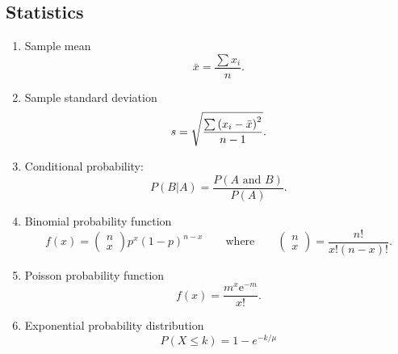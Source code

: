 \subsection{Statistics}

\begin{enumerate}
	\item Sample mean
	\begin{equation*}
	\bar{x}=\frac{\sum x_{i}}{n}.
	\end{equation*}
	
	\item Sample standard deviation
	\begin{equation*}
	s=\sqrt{\frac{\sum \left( x_{i}-\bar{x}\right) ^{2}}{%
			n-1}}.
	\end{equation*}
	
	\item Conditional probability:
	\begin{equation*}
	P(B|A)=\frac{P\left( A\text{ and }B\right) }{P\left( A\right) }.
	\end{equation*}
	
	\item Binomial probability function
	\begin{equation*}
	f\left( x\right) =\left(
	\begin{array}{c}
	n \\
	x%
	\end{array}%
	\right) p^{x}\left( 1-p\right) ^{n-x}\qquad \text{where}\qquad \left(
	\begin{array}{c}
	n \\
	x%
	\end{array}%
	\right) =\frac{n!}{x!\left( n-x\right) !}.
	\end{equation*}
	
	\item Poisson probability function
	\begin{equation*}
	f\left( x\right) =\frac{m^{x}\mathrm{e}^{-m}}{x!}.
	\end{equation*}
	
	\item Exponential probability distribution
	\begin{equation*}
	P\left( X \leq k \right) = 1 - e^{-k/\mu}
	\end{equation*}
	
	
\end{enumerate}

